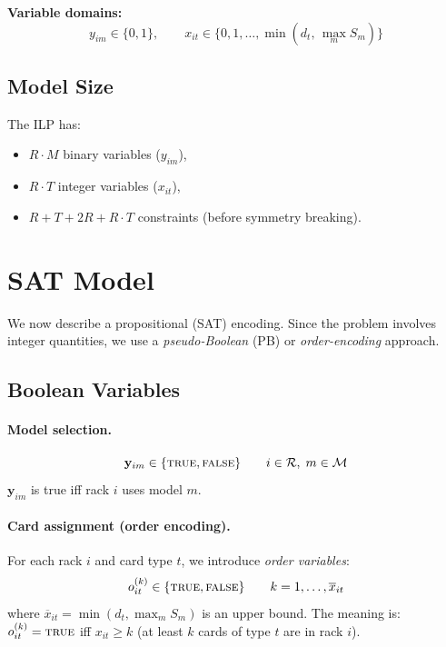 \documentclass[11pt,a4paper]{article}
\newcommand{\setR}{\mathcal{R}}
\newcommand{\setM}{\mathcal{M}}
\begin{document}
\medskip\noindent
\textbf{Variable domains:}
\[
  y_{im} \in \{0,1\}, \qquad
  x_{it} \in \{0, 1, \dots, \min(d_t,\, \max_{m} S_m)\}
\]

\subsection{Model Size}

The ILP has:
\begin{itemize}
  \item $R \cdot M$ binary variables ($y_{im}$),
  \item $R \cdot T$ integer variables ($x_{it}$),
  \item $R + T + 2R + R \cdot T$ constraints
        (before symmetry breaking).
\end{itemize}

\section{SAT Model}
\label{sec:sat}

We now describe a propositional (SAT) encoding.
Since the problem involves integer quantities,
we use a \emph{pseudo-Boolean} (PB) or \emph{order-encoding}
approach.

\subsection{Boolean Variables}

\paragraph{Model selection.}
\begin{equation}
  \mathbf{y}_{im} \in \{\textsc{true}, \textsc{false}\}
  \qquad i \in \setR,\; m \in \setM
\end{equation}
$\mathbf{y}_{im}$ is true iff rack $i$ uses model $m$.

\paragraph{Card assignment (order encoding).}
For each rack $i$ and card type $t$, we introduce
\emph{order variables}:
\begin{equation}
  o_{it}^{(k)} \in \{\textsc{true}, \textsc{false}\}
  \qquad k = 1, \dots, \overline{x}_{it}
\end{equation}
where $\overline{x}_{it} = \min(d_t, \max_m S_m)$ is an upper bound.
The meaning is: $o_{it}^{(k)} = \textsc{true}$ iff
$x_{it} \ge k$ (at least $k$ cards of type $t$ are in rack $i$).
\end{document}

